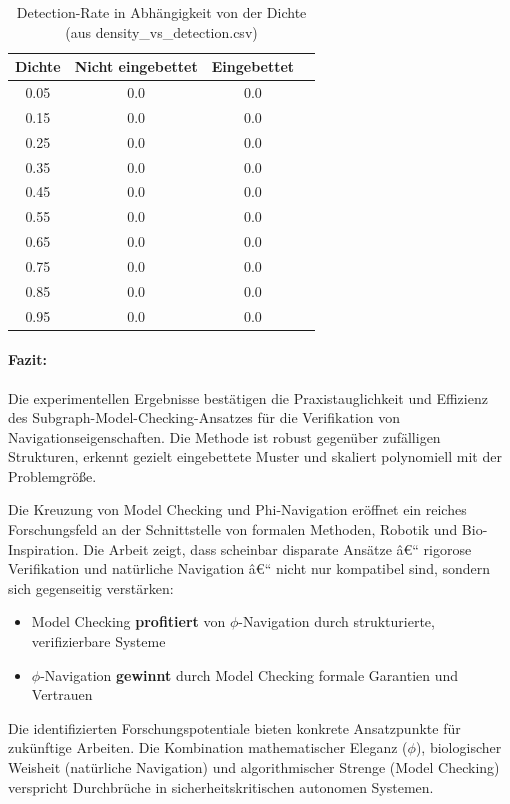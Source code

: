 ﻿\documentclass[a4paper,12pt]{article}
\theoremstyle{definition}
\begin{document}
\begin{table}[h!]
	\centering
	\caption{Detection-Rate in Abhängigkeit von der Dichte (aus density\_vs\_detection.csv)}
	\begin{tabular}{cccc}
		\toprule
		Dichte & Nicht eingebettet & Eingebettet \\
		\midrule
		0.05 & 0.0 & 0.0 \\
		0.15 & 0.0 & 0.0 \\
		0.25 & 0.0 & 0.0 \\
		0.35 & 0.0 & 0.0 \\
		0.45 & 0.0 & 0.0 \\
		0.55 & 0.0 & 0.0 \\
		0.65 & 0.0 & 0.0 \\
		0.75 & 0.0 & 0.0 \\
		0.85 & 0.0 & 0.0 \\
		0.95 & 0.0 & 0.0 \\
		\bottomrule
	\end{tabular}
\end{table}

\paragraph{Fazit:} Die experimentellen Ergebnisse bestätigen die Praxistauglichkeit und Effizienz des Subgraph-Model-Checking-Ansatzes für die Verifikation von Navigationseigenschaften. Die Methode ist robust gegenüber zufälligen Strukturen, erkennt gezielt eingebettete Muster und skaliert polynomiell mit der Problemgröße.

Die Kreuzung von Model Checking und Phi-Navigation eröffnet ein reiches Forschungsfeld an der Schnittstelle von formalen Methoden, Robotik und Bio-Inspiration. Die Arbeit zeigt, dass scheinbar disparate Ansätze â€“ rigorose Verifikation und natürliche Navigation â€“ nicht nur kompatibel sind, sondern sich gegenseitig verstärken:

\begin{itemize}
	\item Model Checking \textbf{profitiert} von $\phi$-Navigation durch strukturierte, verifizierbare Systeme
	\item $\phi$-Navigation \textbf{gewinnt} durch Model Checking formale Garantien und Vertrauen
\end{itemize}

Die identifizierten Forschungspotentiale bieten konkrete Ansatzpunkte für zukünftige Arbeiten. Die Kombination mathematischer Eleganz ($\phi$), biologischer Weisheit (natürliche Navigation) und algorithmischer Strenge (Model Checking) verspricht Durchbrüche in sicherheitskritischen autonomen Systemen.
\end{document}
